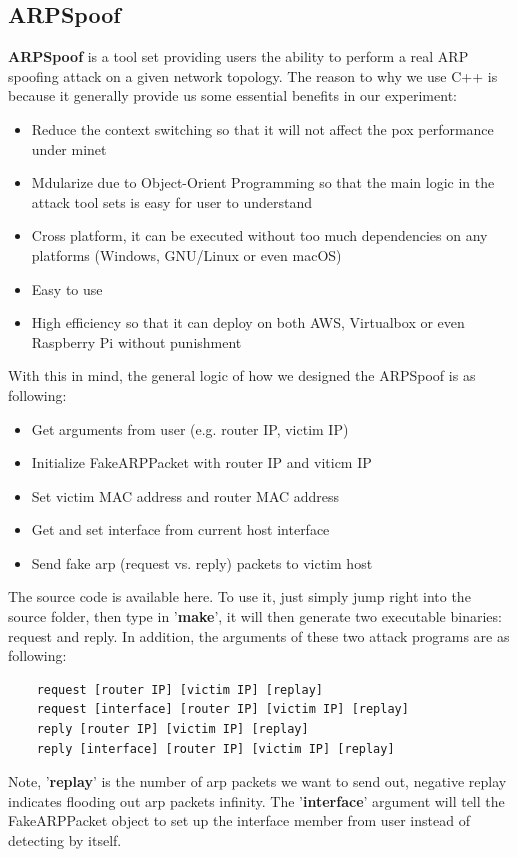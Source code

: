 \documentclass[conference]{IEEEtran}
\begin{document}
\subsection{ARPSpoof}
\textbf{ARPSpoof} is a tool set providing users the ability to perform a real ARP spoofing attack on a given network topology. The reason to why we use C++ is because it generally provide us some essential benefits in our experiment: 
\begin{itemize}
\item Reduce the context switching so that it will not affect the pox performance under minet
\item Mdularize due to Object-Orient Programming so that the main logic in the attack tool sets is easy for user to understand 
\item Cross platform, it can be executed without too much dependencies on any platforms (Windows, GNU/Linux or even macOS)
\item Easy to use
\item High efficiency so that it can deploy on both AWS, Virtualbox or even Raspberry Pi without punishment
\end{itemize}
With this in mind, the general logic of how we designed the ARPSpoof is as following:
\begin{itemize}
    \item Get arguments from user (e.g. router IP, victim IP)
    \item Initialize FakeARPPacket with router IP and viticm IP
    \item Set victim MAC address and router MAC address
    \item Get and set interface from current host interface
    \item Send fake arp (request vs. reply) packets to victim host
\end{itemize}
The source code is available here. To use it, just simply jump right into the source folder, then type in '\textbf{make}', it will then generate two executable binaries: request and reply. In addition, the arguments of these two attack programs are as following:

{
    \tiny
    \begin{verbatim}
    request [router IP] [victim IP] [replay]
    request [interface] [router IP] [victim IP] [replay]
    reply [router IP] [victim IP] [replay]
    reply [interface] [router IP] [victim IP] [replay]
    \end{verbatim}
}

Note, '\textbf{replay}' is the number of arp packets we want to send out, negative replay indicates flooding out arp packets infinity. The '\textbf{interface}' argument will tell the FakeARPPacket object to set up the interface member from user instead of detecting by itself.
\end{document}
